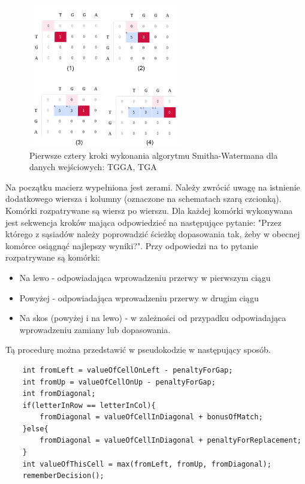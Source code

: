 \documentclass[a4paper,12pt]{article}
\newenvironment{lista}{
\begin{itemize}
  \setlength{\itemsep}{1pt}
  \setlength{\parskip}{0pt}
  \setlength{\parsep}{0pt}
}{\end{itemize}}
\begin{document}
\begin{figure}[H]
  \vspace{5pt}
  \centering
  \begin{center}
  \includegraphics[width=0.6\textwidth]{images/SchematDzialaniaAlgorytmu.png}
  \end{center}
  \caption{Pierwsze cztery kroki wykonania algorytmu Smitha-Watermana dla danych wejściowych: TGGA, TGA}
 \end{figure}

Na początku macierz wypełniona jest zerami. Należy zwrócić uwagę na istnienie dodatkowego wiersza i kolumny (oznaczone na schematach szarą czcionką). Komórki rozpatrywane są wiersz po wierszu. Dla każdej komórki wykonywana jest sekwencja kroków mająca odpowiedzieć na następujące pytanie: "Przez którego z sąsiadów należy poprowadzić ścieżkę dopasowania tak, żeby w obecnej komórce osiągnąć najlepszy wyniki?". Przy odpowiedzi na to pytanie rozpatrywane są komórki:
\begin{lista}
\item Na lewo - odpowiadająca wprowadzeniu przerwy w pierwszym ciągu
\item Powyżej - odpowiadająca wprowadzeniu przerwy w drugim ciągu
\item Na skos (powyżej i na lewo) - w zależności od przypadku odpowiadająca wprowadzeniu zamiany lub dopasowania.
\end{lista}

Tą procedurę można przedstawić w pseudokodzie w następujący sposób. 

\begin{lstlisting}
	int fromLeft = valueOfCellOnLeft - penaltyForGap;
	int fromUp = valueOfCellOnUp - penaltyForGap;
	int fromDiagonal;
	if(letterInRow == letterInCol){
		fromDiagonal = valueOfCellInDiagonal + bonusOfMatch;
	}else{
		fromDiagonal = valueOfCellInDiagonal + penaltyForReplacement;
	}
	int	valueOfThisCell = max(fromLeft, fromUp, fromDiagonal);
	rememberDecision();
\end{lstlisting}
\end{document}
